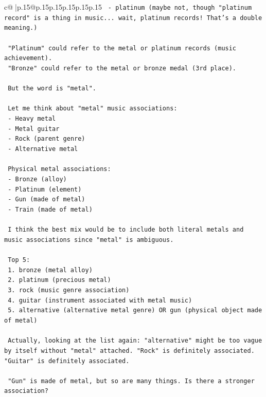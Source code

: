 \documentclass{article}
\begin{document}
{\begin{supertabular}{c@{$\;$}|p{.15\linewidth}@{}p{.15\linewidth}p{.15\linewidth}p{.15\linewidth}p{.15\linewidth}p{.15\linewidth}}
{{{\texttt{ {-} platinum (maybe not, though "platinum record" is a thing in music... wait, platinum records! That's a double meaning.)} \\
\\ 
\texttt{ "Platinum" could refer to the metal or platinum records (music achievement).} \\
\texttt{ "Bronze" could refer to the metal or bronze medal (3rd place).} \\
\\ 
\texttt{ But the word is "metal".} \\
\\ 
\texttt{ Let me think about "metal" music associations:} \\
\texttt{ {-} Heavy metal} \\
\texttt{ {-} Metal guitar} \\
\texttt{ {-} Rock (parent genre)} \\
\texttt{ {-} Alternative metal} \\
\\ 
\texttt{ Physical metal associations:} \\
\texttt{ {-} Bronze (alloy)} \\
\texttt{ {-} Platinum (element)} \\
\texttt{ {-} Gun (made of metal)} \\
\texttt{ {-} Train (made of metal)} \\
\\ 
\texttt{ I think the best mix would be to include both literal metals and music associations since "metal" is ambiguous.} \\
\\ 
\texttt{ Top 5:} \\
\texttt{ 1. bronze (metal alloy)} \\
\texttt{ 2. platinum (precious metal)} \\
\texttt{ 3. rock (music genre association)} \\
\texttt{ 4. guitar (instrument associated with metal music)} \\
\texttt{ 5. alternative (alternative metal genre) OR gun (physical object made of metal)} \\
\\ 
\texttt{ Actually, looking at the list again: "alternative" might be too vague by itself without "metal" attached. "Rock" is definitely associated. "Guitar" is definitely associated.} \\
\\ 
\texttt{ "Gun" is made of metal, but so are many things. Is there a stronger association?} \\
}}}
\end{supertabular}}
\end{document}

